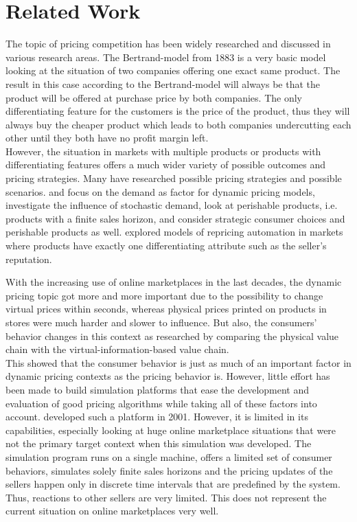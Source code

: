 %
\section{Related Work}
\label{sec:Related_Work}
%
The topic of pricing competition has been widely researched and discussed in various research areas. The Bertrand-model from 1883 \citep{bertrand1883} is a very basic model looking at the situation of two companies offering one exact same product. The result in this case according to the Bertrand-model will always be that the product will be offered at purchase price by both companies. The only differentiating feature for the customers is the price of the product, thus they will always buy the cheaper product which leads to both companies undercutting each other until they both have no profit margin left. \\

However, the situation in markets with multiple products or products with differentiating features offers a much wider variety of possible outcomes and pricing strategies. Many have researched possible pricing strategies and possible scenarios. \citet{kopalle1996} and \citet{chintagunta1996} focus on the demand as factor for dynamic pricing models, \citet{martinez2011} investigate the influence of stochastic demand, \citet{gallego2008} look at perishable products, i.e. products with a finite sales horizon, and \citet{levin2009} consider strategic consumer choices and perishable products as well. \citet{popescu2015} explored models of repricing automation in markets where products have exactly one differentiating attribute such as the seller's reputation. 

With the increasing use of online marketplaces in the last decades, the dynamic pricing topic got more and more important due to the possibility to change virtual prices within seconds, whereas physical prices printed on products in stores were much harder and slower to influence. But also, the consumers' behavior changes in this context as \citet{kannan2001} researched by comparing the physical value chain with the virtual-information-based value chain. \\

This showed that the consumer behavior is just as much of an important factor in dynamic pricing contexts as the pricing behavior is. However, little effort has been made to build simulation platforms that ease the development and evaluation of good pricing algorithms while taking all of these factors into account. \citet{morris2001} developed such a platform in 2001. However, it is limited in its capabilities, especially looking at huge online marketplace situations that were not the primary target context when this simulation was developed. The simulation program runs on a single machine, offers a limited set of consumer behaviors, simulates solely finite sales horizons and the pricing updates of the sellers happen only in discrete time intervals that are predefined by the system. Thus, reactions to other sellers are very limited. This does not represent the current situation on online marketplaces very well.

